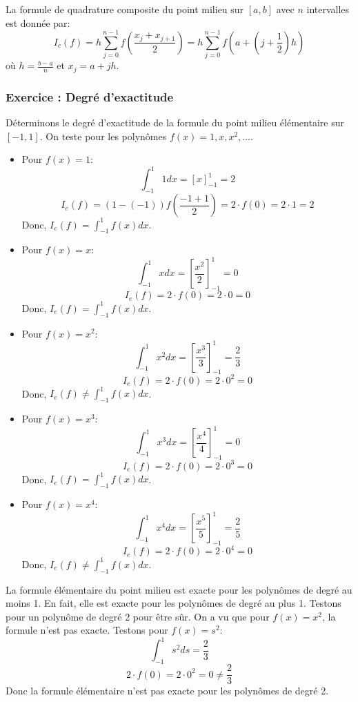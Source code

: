 \documentclass{article}
\begin{document}
La formule de quadrature composite du point milieu sur $[a, b]$ avec $n$ intervalles est donnée par:
\[ I_c(f) = h \sum_{j=0}^{n-1} f\left(\frac{x_j + x_{j+1}}{2}\right) = h \sum_{j=0}^{n-1} f\left(a + (j + \frac{1}{2})h\right) \]
où $h = \frac{b-a}{n}$ et $x_j = a + jh$.

\subsubsection{Exercice : Degré d'exactitude}

Déterminons le degré d'exactitude de la formule du point milieu élémentaire sur $[-1, 1]$. On teste pour les polynômes $f(x) = 1, x, x^2, \dots$.

\begin{itemize}
    \item Pour $f(x) = 1$:
    \[ \int_{-1}^{1} 1 dx = [x]_{-1}^{1} = 2 \]
    \[ I_e(f) = (1 - (-1)) f\left(\frac{-1+1}{2}\right) = 2 \cdot f(0) = 2 \cdot 1 = 2 \]
    Donc, $I_e(f) = \int_{-1}^{1} f(x) dx$.

    \item Pour $f(x) = x$:
    \[ \int_{-1}^{1} x dx = \left[\frac{x^2}{2}\right]_{-1}^{1} = 0 \]
    \[ I_e(f) = 2 \cdot f(0) = 2 \cdot 0 = 0 \]
    Donc, $I_e(f) = \int_{-1}^{1} f(x) dx$.

    \item Pour $f(x) = x^2$:
    \[ \int_{-1}^{1} x^2 dx = \left[\frac{x^3}{3}\right]_{-1}^{1} = \frac{2}{3} \]
    \[ I_e(f) = 2 \cdot f(0) = 2 \cdot 0^2 = 0 \]
    Donc, $I_e(f) \neq \int_{-1}^{1} f(x) dx$.

    \item Pour $f(x) = x^3$:
    \[ \int_{-1}^{1} x^3 dx = \left[\frac{x^4}{4}\right]_{-1}^{1} = 0 \]
    \[ I_e(f) = 2 \cdot f(0) = 2 \cdot 0^3 = 0 \]
    Donc, $I_e(f) = \int_{-1}^{1} f(x) dx$.

    \item Pour $f(x) = x^4$:
    \[ \int_{-1}^{1} x^4 dx = \left[\frac{x^5}{5}\right]_{-1}^{1} = \frac{2}{5} \]
    \[ I_e(f) = 2 \cdot f(0) = 2 \cdot 0^4 = 0 \]
    Donc, $I_e(f) \neq \int_{-1}^{1} f(x) dx$.
\end{itemize}

La formule élémentaire du point milieu est exacte pour les polynômes de degré au moins 1. En fait, elle est exacte pour les polynômes de degré au plus 1. Testons pour un polynôme de degré 2 pour être sûr. On a vu que pour $f(x) = x^2$, la formule n'est pas exacte. Testons pour $f(x) = s^2$:
\[ \int_{-1}^{1} s^2 ds = \frac{2}{3} \]
\[ 2 \cdot f(0) = 2 \cdot 0^2 = 0 \neq \frac{2}{3} \]
Donc la formule élémentaire n'est pas exacte pour les polynômes de degré 2.
\end{document}
